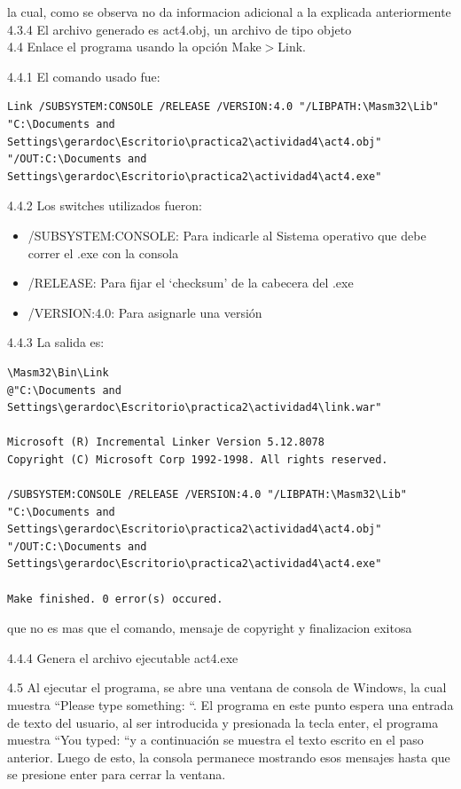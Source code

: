 la cual, como se observa no da informacion adicional a la explicada anteriormente\\


\large{4.3.4} El archivo generado es act4.obj, un archivo de tipo objeto\\


\large{4.4} Enlace el programa usando la opción Make$>$Link.


\large{4.4.1} El comando usado fue:
\begin{verbatim}
Link /SUBSYSTEM:CONSOLE /RELEASE /VERSION:4.0 "/LIBPATH:\Masm32\Lib"
"C:\Documents and Settings\gerardoc\Escritorio\practica2\actividad4\act4.obj" 
"/OUT:C:\Documents and Settings\gerardoc\Escritorio\practica2\actividad4\act4.exe" 

\end{verbatim}



\large{4.4.2} Los switches utilizados fueron:
\begin{itemize}
  \item /SUBSYSTEM:CONSOLE: Para indicarle al Sistema operativo que debe correr el .exe con la consola
  \item /RELEASE: Para fijar el ‘checksum’ de la cabecera del .exe
  \item /VERSION:4.0: Para asignarle una versión
\end{itemize}


\large{4.4.3} La salida es:

\begin{verbatim}
\Masm32\Bin\Link 
@"C:\Documents and Settings\gerardoc\Escritorio\practica2\actividad4\link.war"

Microsoft (R) Incremental Linker Version 5.12.8078
Copyright (C) Microsoft Corp 1992-1998. All rights reserved.

/SUBSYSTEM:CONSOLE /RELEASE /VERSION:4.0 "/LIBPATH:\Masm32\Lib" 
"C:\Documents and Settings\gerardoc\Escritorio\practica2\actividad4\act4.obj" 
"/OUT:C:\Documents and Settings\gerardoc\Escritorio\practica2\actividad4\act4.exe" 

Make finished. 0 error(s) occured.

\end{verbatim}
que no es mas que el comando, mensaje de copyright y finalizacion exitosa


\large{4.4.4} Genera el archivo ejecutable act4.exe

\large{4.5} Al ejecutar el programa, se abre una ventana de consola de Windows, la cual muestra “Please type something: “. El programa en este punto espera una entrada de texto del usuario, al ser introducida y presionada la tecla enter, el programa muestra “You typed: “y a continuación se muestra el texto escrito en el paso anterior. Luego de esto, la consola permanece mostrando esos mensajes hasta que se presione enter para cerrar la ventana.

